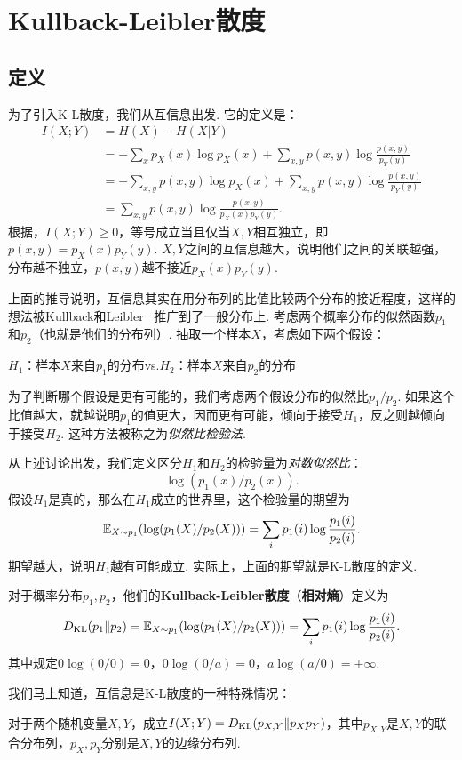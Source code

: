 \section{Kullback-Leibler散度}\label{sec:kl-divergence}
\subsection{定义}
为了引入K-L散度，我们从互信息出发. 它的定义是：
\begin{align*}
    I(X;Y)&=H(X)-H(X|Y)\\
    &=-\sum_{x}p_X(x)\log p_X(x)+\sum_{x,y}p(x,y)\log\frac{p(x,y)}{p_Y(y)}\\
    &=-\sum_{x,y}p(x,y)\log p_X(x)+\sum_{x,y}p(x,y)\log\frac{p(x,y)}{p_Y(y)}\\
    &=\sum_{x,y}p(x,y)\log\frac{p(x,y)}{p_X(x)p_Y(y)}.
\end{align*}
根据，$I(X;Y)\geq 0$，等号成立当且仅当$X,Y$相互独立，即$p(x,y)=p_X(x)p_Y(y)$. $X,Y$之间的互信息越大，说明他们之间的关联越强，分布越不独立，$p(x,y)$越不接近$p_X(x)p_Y(y)$. 

上面的推导说明，互信息其实在用分布列的比值比较两个分布的接近程度，这样的想法被Kullback和Leibler~\cite{kullbackInformationSufficiency1951} 推广到了一般分布上. 考虑两个概率分布的似然函数$p_1$和$p_2$（也就是他们的分布列）. 抽取一个样本$X$，考虑如下两个假设：
\begin{center}
    $H_1$：样本$X$来自$p_1$的分布\quad vs.\quad $H_2$：样本$X$来自$p_2$的分布
\end{center}

为了判断哪个假设是更有可能的，我们考虑两个假设分布的似然比$p_1/p_2$. 如果这个比值越大，就越说明$p_1$的值更大，因而更有可能，倾向于接受$H_1$，反之则越倾向于接受$H_2$. 这种方法被称之为\textit{似然比检验法}.

从上述讨论出发，我们定义区分$H_1$和$H_2$的检验量为\textit{对数似然比}：
\[\log(p_1(x)/p_2(x)).\]
假设$H_1$是真的，那么在$H_1$成立的世界里，这个检验量的期望为
    \[\mathbb{E}_{X\sim p_1}(\log(p_1(X)/p_2(X)))=\sum_ip_1(i)\log\frac{p_1(i)}{p_2(i)}.\]
期望越大，说明$H_1$越有可能成立. 实际上，上面的期望就是K-L散度的定义.
\begin{definition}
    对于概率分布$p_1,p_2$，他们的\textbf{Kullback-Leibler散度}（\textbf{相对熵}）定义为
    \[D_{\mathrm{KL}}(p_1\| p_2)=\mathbb{E}_{X\sim p_1}(\log(p_1(X)/p_2(X)))=\sum_ip_1(i)\log\frac{p_1(i)}{p_2(i)}.\]
其中规定$0\log(0/0)=0$，$0\log(0/a)=0$，$a\log(a/0)=+\infty$.
\end{definition}
我们马上知道，互信息是K-L散度的一种特殊情况：
\begin{proposition}\label{prop:mutual-information-kl-divergence}
    对于两个随机变量$X,Y$，成立$I(X;Y)=D_{\mathrm{KL}}(p_{X,Y}\|p_Xp_Y)$，其中$p_{X,Y}$是$X,Y$的联合分布列，$p_X,p_Y$分别是$X,Y$的边缘分布列.
\end{proposition}

